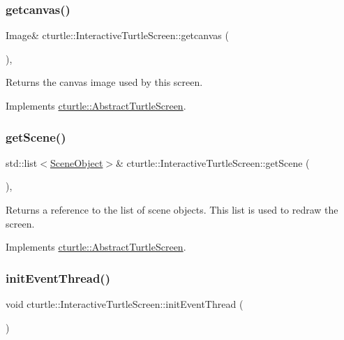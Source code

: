 \subsubsection{\texorpdfstring{getcanvas()}{getcanvas()}}
{\footnotesize\ttfamily Image\& cturtle\+::\+Interactive\+Turtle\+Screen\+::getcanvas (\begin{DoxyParamCaption}{ }\end{DoxyParamCaption})\hspace{0.3cm}{\ttfamily [inline]}, {\ttfamily [virtual]}}

Returns the canvas image used by this screen. 

Implements \hyperlink{classcturtle_1_1AbstractTurtleScreen}{cturtle\+::\+Abstract\+Turtle\+Screen}.

\mbox{\label{classcturtle_1_1InteractiveTurtleScreen_aa1bd826458a718e7605424d5767f79c9}} 
\subsubsection{\texorpdfstring{get\+Scene()}{getScene()}}
{\footnotesize\ttfamily std\+::list$<$\hyperlink{structcturtle_1_1SceneObject}{Scene\+Object}$>$\& cturtle\+::\+Interactive\+Turtle\+Screen\+::get\+Scene (\begin{DoxyParamCaption}{ }\end{DoxyParamCaption})\hspace{0.3cm}{\ttfamily [inline]}, {\ttfamily [virtual]}}

Returns a reference to the list of scene objects. This list is used to redraw the screen. 

Implements \hyperlink{classcturtle_1_1AbstractTurtleScreen}{cturtle\+::\+Abstract\+Turtle\+Screen}.

\mbox{\label{classcturtle_1_1InteractiveTurtleScreen_aa7c436f89d052e42500356ee5f479776}} 
\subsubsection{\texorpdfstring{init\+Event\+Thread()}{initEventThread()}}
{\footnotesize\ttfamily void cturtle\+::\+Interactive\+Turtle\+Screen\+::init\+Event\+Thread (\begin{DoxyParamCaption}{ }\end{DoxyParamCaption})\hspace{0.3cm}{\ttfamily [protected]}}

